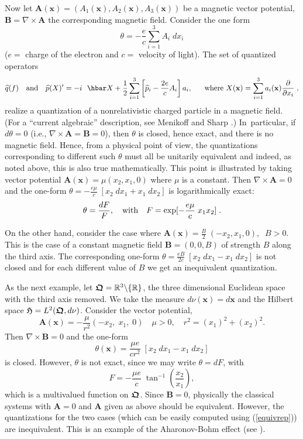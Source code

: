 \documentclass[11pt]{amsart}
\numberwithin{equation}{section}
\theoremstyle{remark}
\newcommand\HH{\mathfrak H}
\newcommand{\be}{\begin{equation}}
\newcommand{\en}{\end{equation}}
\newcommand{\bfrakQ}{\mbox{\boldmath $\mathfrak Q$}}
\newcommand{\bA}{\mathbf A}
\newcommand{\bB}{\mathbf B}
\newcommand{\bx}{\mathbf x}
\begin{document}
Now let $\bA (\bx ) = (A_1 (\bx ) , A_2 (\bx ),  A_3 (\bx ))$ be a magnetic
vector potential, $\bB = \nabla \times \bA$ the corresponding magnetic field.
Consider the one form
$$\theta = -\frac ec \sum_{i=1}^3 A_i \;dx_i$$
($e = $ charge of the electron and $c = $ velocity of light). The set of
quantized operators
\be
  \widehat{q}(f) \quad \mbox{\rm and} \quad  \widehat{p}(X)' = -i\hbar X +
  \frac 12\sum_{i=1}^3 \left[\widehat{p}_i - \frac {2e}c A_i\right]a_i , \quad
 \text{where } X(\bx ) = \sum_{i=1}^3 a_i (\bx )\frac \partial{\partial x_i}\;,
\label{quantizedops}
\en
realize a quantization of a nonrelativistic charged particle in a magnetic
field. (For a ``current algebraic'' description, see Menikoff and Sharp
\cite{bib:MenSh}.) In~particular, if $d\theta = 0$  (i.e., $\nabla \times \bA = \bB = 0$),
then $\theta$ is closed, hence exact, and there is no magnetic field. Hence,
from a physical point of view, the quantizations corresponding to different
such $\theta$ must all be unitarily equivalent and indeed, as noted above,
this is also true mathematically. This point is illustrated by taking vector
potential  $\bA (\bx ) = \mu (x_2 , x_1 , 0)$ where $\mu$ is a constant.
Then $\nabla \times \bA = 0$ and the one-form
$\theta = -\frac {e\mu}c\; [x_2\;dx_1 + x_1 \; dx_2]$
is logarithmically exact:
$$ \theta = \frac {dF}F, \quad \mbox{\rm with} \quad F =
     \exp[-\frac {e\mu}c\; x_1 x_2 ] \; . $$

     On the other hand, consider the case where $\bA (\bx ) = \frac B2\;
(-x_2 , x_1 , 0), \;\; B > 0$.
This is the case of a constant magnetic field $\bB = (0, 0, B)$ of strength $B$
along the third axis. The corresponding one-form
$\theta = \frac {eB}{2c}\; [x_2\;dx_1  -  x_1 \; dx_2]$ is not closed and for
each different value of $B$ we get an inequivalent quantization.

\bigskip

As the next example, let $\bfrakQ = {\mathbb R}^3\backslash\{\mathbb R\}$, the
three dimensional Euclidean space with the third axis removed. We take the
measure $d\nu (\bx ) = d\bx$ and the Hilbert space $\HH = L^2 (\bfrakQ, d\nu)$.
Consider the vector potential,
$$ \bA (\bx ) =  -\frac \mu {r^2}(-x_2 , \; x_1 , \; 0 )\quad \mu > 0 ,
   \quad  r^2 =  (x_1)^2 +  (x_2)^2 . $$
Then $\nabla \times \bB = 0$ and the one-form
\be
   \theta (\bx ) = \frac{\mu e}{c r^2}\;[x_2\;dx_1 -  x_1\;dx_2 ]
\label{closedoneform}
\en
is closed. However, $\theta$ is not exact, since we may write $\theta = dF$,
with
\be
   F = -\frac{\mu e}c\; \tan^{-1} \left(\frac {x_2}{x_1}\right),
\label{aharonovpot}
\en
which is a multivalued function on $\bfrakQ$. Since $\bB = 0$, physically the
classical systems with $\bA = 0$ and $\bA$ given as above should be equivalent.
However, the quantizations for the two cases (which can be easily computed
using (\ref{equivrep})) are inequivalent. This is an example of the
Aharonov-Bohm effect (see \cite{bib:-ahabohm}).
\end{document}
